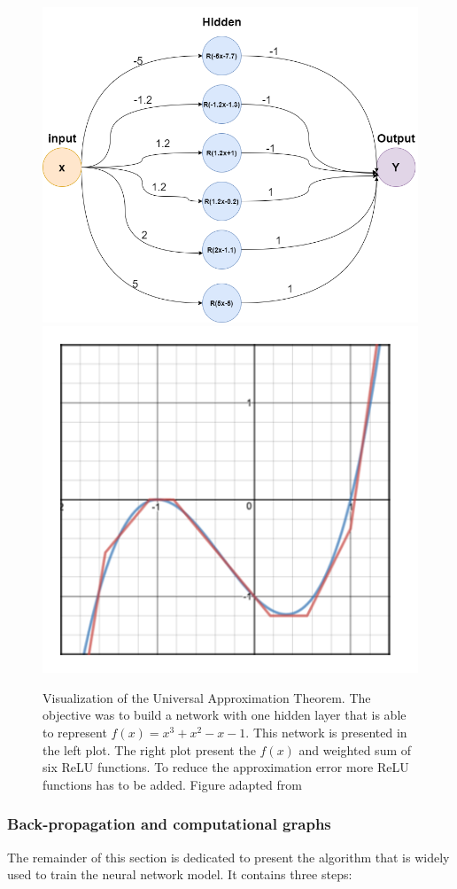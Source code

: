 \begin{figure}[!htb]
 \begin{center}
   \includegraphics[width=0.7\linewidth]{figures/UAT_2.png}\\
    \includegraphics[width=0.7\linewidth]{figures/UAT.PNG}
   \caption[Visualization of the Universal Approximation Theorem]{Visualization of the Universal Approximation Theorem. The objective was to build a network with one hidden layer that is able to represent $f(x)= x^{3}+x^{2}-x-1$. This network is presented in the left plot. The right plot present the $f(x)$ and weighted sum of six ReLU functions. To reduce the approximation error more ReLU functions has to be added. Figure adapted from \cite{UAT_blog}
     \label{fig:Universal_approx}}
 \end{center}
\end{figure}

\subsubsection{Back-propagation and computational graphs}
The remainder of this section is dedicated to present the algorithm that is widely used to train the neural network model. It contains three steps: 

